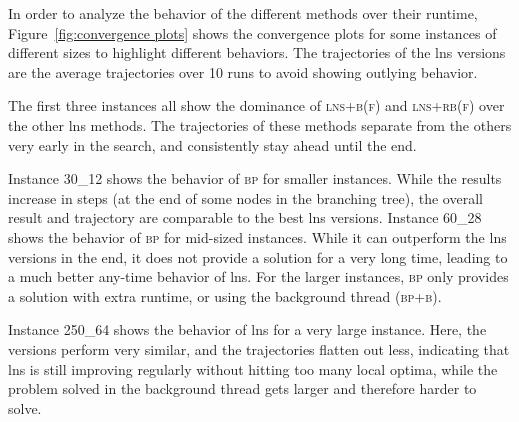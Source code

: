 \documentclass[]{amsart}
\newcommand{\bpplain}{\textsc{bp}\xspace}
\newcommand{\bpbg}{\textsc{bp+b}\xspace}
\newcommand{\lnsr}{\textsc{lns+r(b)}\xspace}
\newcommand{\lnsrf}{\textsc{lns+r(f)}\xspace}
\newcommand{\lnsrbf}{\textsc{lns+rb(f)}\xspace}
\newcommand{\lnsbf}{\textsc{lns+b(f)}\xspace}
\theoremstyle{plain}
\begin{document}
In order to analyze the behavior of the different methods over their runtime, Figure~\ref{fig:convergence plots} shows the convergence plots for some instances of different sizes to highlight different behaviors. The trajectories of the \gls{lns} versions are the average trajectories over 10 runs to avoid showing outlying behavior. 

The first three instances all show the dominance of \lnsbf and \lnsrbf over the other \gls{lns} methods. The trajectories of these methods separate from the others very early in the search, and consistently stay ahead until the end.

Instance 30\_12 shows the behavior of \bpplain for smaller instances. While the results increase in steps (at the end of some nodes in the branching tree), the overall result and trajectory are comparable to the best \gls{lns} versions. Instance 60\_28 shows the behavior of \bpplain for mid-sized instances. While it can outperform the \gls{lns} versions in the end, it does not provide a solution for a very long time, leading to a much better any-time behavior of \gls{lns}. For the larger instances, \bpplain only provides a solution with extra runtime, or using the background thread (\bpbg).

Instance 250\_64 shows the behavior of \gls{lns} for a very large instance. Here, the versions perform very similar, and the trajectories flatten out less, indicating that \gls{lns} is still improving regularly without hitting too many local optima, while the problem solved in the background thread gets larger and therefore harder to solve.






\end{document}
